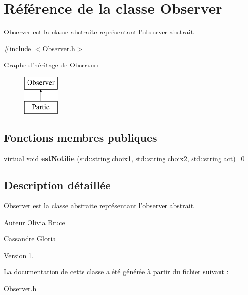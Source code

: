 \hypertarget{classObserver}{\section{\-Référence de la classe \-Observer}
\label{classObserver}
}


\hyperlink{classObserver}{\-Observer} est la classe abstraite représentant l'observer abstrait.  




{\ttfamily \#include $<$\-Observer.\-h$>$}

\-Graphe d'héritage de \-Observer\-:\begin{figure}[H]
\begin{center}
\leavevmode
\includegraphics[height=2.000000cm]{classObserver}
\end{center}
\end{figure}
\subsection*{\-Fonctions membres publiques}
\begin{DoxyCompactItemize}
\item 
\hypertarget{classObserver_ada9b4853829cf3806379037cf4e6fcc6}{virtual void {\bfseries est\-Notifie} (std\-::string choix1, std\-::string choix2, std\-::string act)=0}\label{classObserver_ada9b4853829cf3806379037cf4e6fcc6}

\end{DoxyCompactItemize}


\subsection{\-Description détaillée}
\hyperlink{classObserver}{\-Observer} est la classe abstraite représentant l'observer abstrait. 

\begin{DoxyAuthor}{\-Auteur}
\-Olivia \-Bruce 

\-Cassandre \-Gloria 
\end{DoxyAuthor}
\begin{DoxyVersion}{\-Version}
1. 
\end{DoxyVersion}


\-La documentation de cette classe a été générée à partir du fichier suivant \-:\begin{DoxyCompactItemize}
\item 
\-Observer.\-h\end{DoxyCompactItemize}
